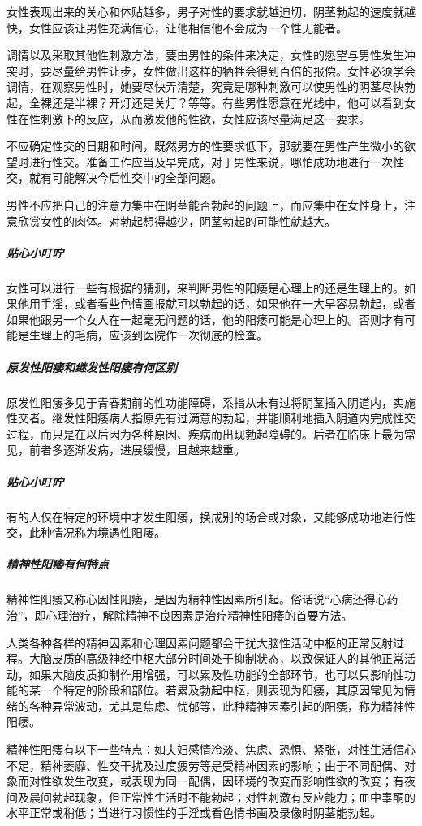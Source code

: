 \begin{enumerate}
女性表现出来的关心和体贴越多，男子对性的要求就越迫切，阴茎勃起的速度就越快，女性应该让男性充满信心，让他相信他不会成为一个性无能者。

调情以及采取其他性刺激方法，要由男性的条件来决定，女性的愿望与男性发生冲突时，要尽量给男性让步，女性做出这样的牺牲会得到百倍的报偿。女性必须学会调情，在观察男性时，她要尽快弄清楚，究竟是哪种刺激可以使男性的阴茎尽快勃起，全裸还是半裸？开灯还是关灯？等等。有些男性愿意在光线中，他可以看到女性在性刺激下的反应，从而激发他的性欲，女性应该尽量满足这一要求。

不应确定性交的日期和时间，既然男方的性要求低下，那就要在男性产生微小的欲望时进行性交。准备工作应当及早完成，对于男性来说，哪怕成功地进行一次性交，就有可能解决今后性交中的全部问题。

男性不应把自己的注意力集中在阴茎能否勃起的问题上，而应集中在女性身上，注意欣赏女性的肉体。对勃起想得越少，阴茎勃起的可能性就越大。

\subparagraph{贴心小叮咛}

女性可以进行一些有根据的猜测，来判断男性的阳痿是心理上的还是生理上的。如果他用手淫，或者看些色情画报就可以勃起的话，如果他在一大早容易勃起，或者如果他跟另一个女人在一起毫无问题的话，他的阳痿可能是心理上的。否则才有可能是生理上的毛病，应该到医院作一次彻底的检查。

\subparagraph{原发性阳痿和继发性阳痿有何区别}

原发性阳痿多见于青春期前的性功能障碍，系指从未有过将阴茎插入阴道内，实施性交者。继发性阳痿病人指原先有过满意的勃起，并能顺利地插入阴道内完成性交过程，而只是在以后因为各种原因、疾病而出现勃起障碍的。后者在临床上最为常见，前者多逐渐发病，进展缓慢，且越来越重。

\subparagraph{贴心小叮咛}

有的人仅在特定的环境中才发生阳痿，换成别的场合或对象，又能够成功地进行性交，此种情况称为境遇性阳痿。

\subparagraph{精神性阳痿有何特点}

精神性阳痿又称心因性阳痿，是因为精神性因素所引起。俗话说“心病还得心药治”，即心理治疗，解除精神不良因素是治疗精神性阳痿的首要方法。

人类各种各样的精神因素和心理因素问题都会干扰大脑性活动中枢的正常反射过程。大脑皮质的高级神经中枢大部分时间处于抑制状态，以致保证人的其他正常活动，如果大脑皮质抑制作用增强，可以累及性功能的全部环节，也可以只影响性功能的某一个特定的阶段和部位。若累及勃起中枢，则表现为阳痿，其原因常见为情绪的各种异常波动，尤其是焦虑、忧郁等，此种精神因素引起的阳痿，称为精神性阳痿。

精神性阳痿有以下一些特点：如夫妇感情冷淡、焦虑、恐惧、紧张，对性生活信心不足，精神萎靡、性交干扰及过度疲劳等是受精神因素的影响；由于不同配偶、对象而对性欲发生改变，或表现为同一配偶，因环境的改变而影响性欲的改变；有夜间及晨间勃起现象，但正常性生活时不能勃起；对性刺激有反应能力；血中睾酮的水平正常或稍低；当进行习惯性的手淫或看色情书画及录像时阴茎能勃起。


\end{enumerate}
